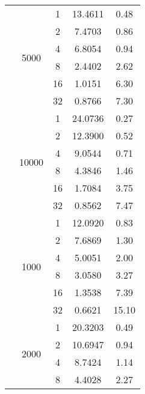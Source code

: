 \begin{tabularx}{\textwidth}{@{} c c c c c @{}}
                            & \multirow{6}{*}{5000} & 1  & 13.4611 & 0.48 \\
                            &                       & 2  & 7.4703  & 0.86 \\
                            &                       & 4  & 6.8054  & 0.94 \\
                            &                       & 8  & 2.4402  & 2.62 \\
                            &                       & 16 & 1.0151  & 6.30 \\
                            &                       & 32 & 0.8766  & 7.30 \\
                            \cmidrule{2-5}
                            & \multirow{6}{*}{10000} & 1  & 24.0736 & 0.27 \\
                            &                        & 2  & 12.3900 & 0.52 \\
                            &                        & 4  & 9.0544  & 0.71 \\
                            &                        & 8  & 4.3846  & 1.46 \\
                            &                        & 16 & 1.7084  & 3.75 \\
                            &                        & 32 & 0.8562  & 7.47 \\
\midrule\enlargethispage{-\baselineskip}
    \multirow{24}{*}{50000} & \multirow{6}{*}{1000} & 1  & 12.0920 & 0.83  \\
                            &                       & 2  & 7.6869  & 1.30  \\
                            &                       & 4  & 5.0051  & 2.00  \\
                            &                       & 8  & 3.0580  & 3.27  \\
                            &                       & 16 & 1.3538  & 7.39  \\
                            &                       & 32 & 0.6621  & 15.10 \\
                            \cmidrule{2-5}
                            & \multirow{6}{*}{2000} & 1  & 20.3203 & 0.49 \\
                            &                       & 2  & 10.6947 & 0.94 \\
                            &                       & 4  & 8.7424  & 1.14 \\
                            &                       & 8  & 4.4028  & 2.27 \\

\end{tabularx}
